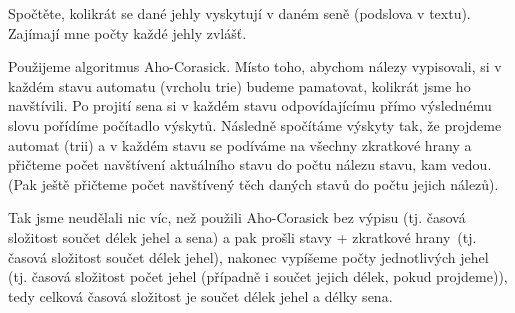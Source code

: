 \documentclass[12pt]{article}                   %
\begin{document}
\begin{priklad}[jehly]
	Spočtěte, kolikrát se dané jehly vyskytují v daném seně (podslova v textu). Zajímají mne počty každé jehly zvlášť.

	\begin{reseni}
		Použijeme algoritmus Aho-Corasick. Místo toho, abychom nálezy vypisovali, si v každém stavu automatu (vrcholu trie) budeme pamatovat, kolikrát jsme ho navštívili. Po projití sena si v každém stavu odpovídajícímu přímo výslednému slovu pořídíme počítadlo výskytů. Následně spočítáme výskyty tak, že projdeme automat (trii) a v každém stavu se podíváme na všechny zkratkové hrany a přičteme počet navštívení aktuálního stavu do počtu nálezu stavu, kam vedou. (Pak ještě přičteme počet navštívený těch daných stavů do počtu jejich nálezů).

		Tak jsme neudělali nic víc, než použili Aho-Corasick bez výpisu (tj. časová složitost součet délek jehel a sena) a pak prošli stavy + zkratkové hrany (tj. časová složitost součet délek jehel), nakonec vypíšeme počty jednotlivých jehel (tj. časová složitost počet jehel (případně i součet jejich délek, pokud projdeme)), tedy celková časová složitost je součet délek jehel a délky sena.
	\end{reseni}
\end{priklad}
\end{document}
